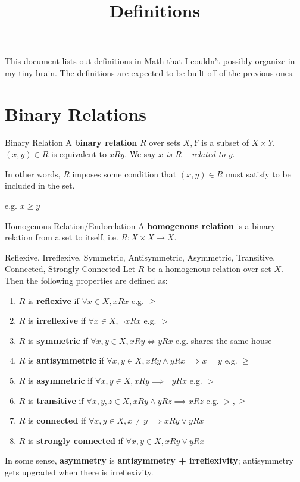 \documentclass[a4paper, 10pt]{article}
\title{Definitions}
\begin{document}
This document lists out definitions in Math that I couldn't possibly organize in my tiny brain. The definitions are expected to be built off of the previous ones.


\section{Binary Relations}
\begin{definition} {Binary Relation}
    A \textbf{binary relation} \(R\) over sets \(X, Y\) is a subset of \(X \times Y\). \((x, y) \in R \) is equivalent to \(xRy\). We say \textit{\(x\) is \(R-\)related to \(y\)}.

    In other words, \(R\) imposes some condition that \((x, y) \in R\) must satisfy to be included in the set.

    e.g. \(x \geq y\)
\end{definition}

\begin{definition} {Homogenous Relation/Endorelation}
    A \textbf{homogenous relation} is a binary relation from a set to itself, i.e. \(R: X \times X \to X\).

\end{definition}

\begin{definition} {Reflexive, Irreflexive, Symmetric, Antisymmetric, Asymmetric, Transitive, Connected, Strongly Connected}
    Let \(R\) be a homogenous relation over set \(X\). Then the following properties are defined as:

    \begin{enumerate}
        \item \(R\) is \textbf{reflexive} if \(\forall x \in X, xRx\) e.g. \(\geq\)
        \item \(R\) is \textbf{irreflexive} if \(\forall x \in X, \neg xRx\) e.g. \(>\)
        \item \(R\) is \textbf{symmetric} if \(\forall x, y \in X, xRy \Leftrightarrow yRx\) e.g. shares the same house
        \item \(R\) is \textbf{antisymmetric} if \(\forall x, y \in X, xRy \land yRx \implies x = y\) e.g. \(\geq\)
        \item \(R\) is \textbf{asymmetric} if \(\forall x, y \in X, xRy \implies \neg yRx\) e.g. \(>\)
        \item \(R\) is \textbf{transitive} if \(\forall x, y, z \in X, xRy \land yRz \implies xRz\) e.g. \(>, \geq\)
        \item \(R\) is \textbf{connected} if \(\forall x, y \in X, x \neq y \implies xRy \lor yRx\)
        \item \(R\) is \textbf{strongly connected} if \(\forall x, y \in X, xRy \lor yRx\)
    \end{enumerate}
\end{definition}
\begin{remark}
    In some sense, \textbf{asymmetry} is \textbf{antisymmetry + irreflexivity}; antisymmetry gets upgraded when there is irreflexivity.
\end{remark}
\end{document}
